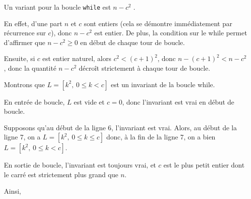 \exer{}
\setcounter{numques}{0}

\question{} Un variant pour la boucle \texttt{while} est \og $n - c^2$ \fg{}. 

En effet, d'une part $n$ et $c$ sont entiers (cela se démontre immédiatement par récurrence sur $c$), donc $n-c^2$ est entier. 
De plus, la condition sur le while permet d'affirmer que $n-c^2 \geq 0$ en début de chaque tour de boucle. 

Ensuite, si $c$ est entier naturel, alors $c^2 < (c+1)^2$, donc $n-(c+1)^2 < n-c^2$, donc la quantité $n-c^2$ décroît strictement à chaque tour de boucle. 


\medskip{}

\question{}
Montrons que \og $L = [k^2,~ 0 \leq k < c]$ \fg{} est un invariant de la boucle while. 

En entrée de boucle, $L$ est vide et $c=0$, donc l'invariant est vrai en début de boucle.

Supposons qu'au début de la ligne 6, l'invariant est vrai. Alors, au début de la ligne 7, on a $L = [k^2,~ 0 \leq k \leq c]$ donc, à la fin de la ligne 7, on a bien $L = [k^2,~ 0 \leq k < c]$. 


En sortie de boucle, l'invariant est toujours vrai, et $c$ est le plus petit entier dont le carré est strictement plus grand que $n$. 

Ainsi, 